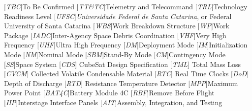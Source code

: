 \begin{acronym}[XXXXXXXX]
    [\textit{TBC}]{To Be Confirmed}
    [\textit{TT\&TC}]{Telemetry and Telecommand}
    [\textit{TRL}]{Technology Readiness Level}
    [\textit{UFSC}]{\textit{Universidade Federal de Santa Catarina}, or Federal University of Santa Catarina}
    [\textit{WBS}]{Work Breakdown Structure}
    [\textit{WP}]{Work Package}
    [\textit{IADC}]{Inter-Agency Space Debris Coordination}
    [\textit{VHF}]{Very High Frequency}
    [\textit{UHF}]{Ultra High Frequency}
    [\textit{DM}]{Deployment Mode}
    [\textit{IM}]{Initialization Mode}
    [\textit{NM}]{Nominal Mode}
    [\textit{SBM}]{Stand-By Mode}
    [\textit{CM}]{Contingency Mode}
    [\textit{SS}]{Space System}
    [\textit{CDS}] {CubeSat Design Specification}
    [\textit{TML}] {Total Mass Loss}
    [\textit{CVCM}] {Collected Volatile Condensable Material}
    [\textit{RTC}] {Real Time Clocks}
    [\textit{DoD}] {Depth of Discharge}
    [\textit{RTD}] {Resistance Temperature Detector}
    [\textit{MPP}]{Maximum Power Point}
    [\textit{BAT4C}]{Battery Module 4C}
    [\textit{RBF}]{Remove Before Flight}
    [\textit{IIP}]{Interstage Interface Panels}
    [\textit{AIT}]{Assembly, Integration, and Testing}
\end{acronym}